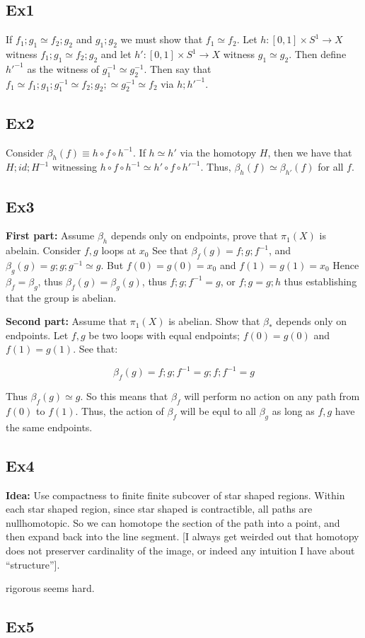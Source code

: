 \documentclass[11pt]{article}
\newcommand*{\start}[1]{\leavevmode\newline \textbf{#1} }
\begin{document}
\subsection{Ex1}
If $f_1 ; g_1 \simeq f_2 ; g_2$ and $g_1 ; g_2$ we must show that $f_1 \simeq f_2$. Let $h: [0, 1] \times S^1 \rightarrow X$
witness $f_1; g_1 \simeq f_2; g_2$ and let $h': [0, 1] \times S^1 \rightarrow X$ witness $g_1 \simeq g_2$. Then
define $h'^{-1}$ as the witness of $g_1^{-1} \simeq g_2^{-1}$. Then say that $f_1 \simeq f_1; g_1; g_1^{-1} \simeq f_2; g_2; \simeq g_2^{-1} \simeq f_2$ via $h; h'^{-1}$.

\subsection{Ex2}
Consider $\beta_h(f) \equiv h \circ f \circ h^{-1}$. If $h \simeq h'$ via the homotopy $H$, then we have that $H; id; H^{-1}$ 
witnessing $h \circ f \circ h^{-1} \simeq h' \circ f \circ h'^{-1}$. Thus, $\beta_h(f) \simeq \beta_{h'}(f)$ for all $f$.

\subsection{Ex3}

\start{First part:} Assume $\beta_h$ depends only on endpoints, prove that $\pi_1(X)$ is abelain. Consider $f, g$ loops at $x_0$
See that $\beta_f(g) = f; g; f^{-1}$, and $\beta_g(g) = g; g; g^{-1} \simeq g$. But $f(0) = g(0) = x_0$ and $f(1) = g(1) = x_0$
Hence $\beta_f = \beta_g$, thus $\beta_f(g) = \beta_g(g)$, thus $f; g; f^{-1} = g$, or $f; g = g; h$ thus establishing
that the group is abelian.

\start{Second part:} Assume that $\pi_1(X)$ is abelian. Show that $\beta_*$ depends only on endpoints. Let $f, g$ be two
loops with equal endpoints; $f(0) = g(0)$ and $f(1) = g(1)$. See that:

$$
\beta_f(g) = f; g; f^{-1} = g; f; f^{-1} = g
$$

Thus $\beta_f(g) \simeq g$. So this means that $\beta_f$ will perform no action on any path from $f(0)$ to $f(1)$.
Thus, the action of $\beta_f$ will be equl to all $\beta_g$ as long as $f, g$ have the same endpoints.

\subsection{Ex4}
\start{Idea:} Use compactness to finite finite subcover of star shaped regions. Within each star shaped region,
since star shaped is contractible, all paths are nullhomotopic. So we can homotope the section of the path into a point, and then expand
back into the line segment. [I always get weirded out that homotopy does not preserver cardinality of the image, or indeed any intuition I have about
``structure''].


rigorous seems hard.

\subsection{Ex5}
\end{document}

